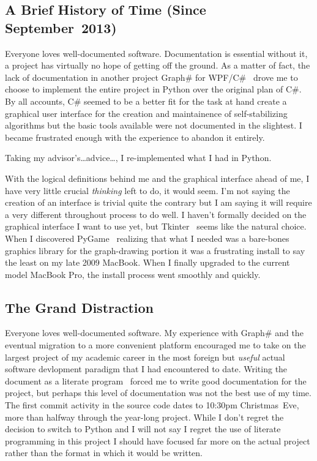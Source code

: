 \subsection{A Brief History of Time (Since September~2013)}
Everyone loves well-documented software.
Documentation is essential \Dash without it, a project has virtually no hope of getting off the ground.
As a matter of fact, the lack of documentation in another project \Dash
  Graph\# for WPF/C\#~\autocite{palesz:graphsharp} \Dash
  drove me to choose to implement the entire project in Python over the original plan of C\#.
By all accounts, C\# seemed to be a better fit for the task at hand \Dash
  create a graphical user interface for the creation and maintainence of self-stabilizing algorithms \Dash
  but the basic tools available were not documented in the slightest.
I became frustrated enough with the experience to abandon it entirely.

Taking my advisor's\dots advice\dots, I re-implemented what I had in Python.

\bigskip

With the logical definitions behind me and the graphical interface ahead of me,
  I have very little crucial \emph{thinking} left to do, it would seem.
I'm not saying the creation of an interface is trivial \Dash quite the contrary \Dash
  but I am saying it will require a very different throughout process to do well.
I haven't formally decided on the graphical interface I want to use yet,
  but Tkinter~\autocite{tkinter} seems like the natural choice.
When I discovered PyGame~\autocite{pygame} \Dash realizing that what I needed was
  a bare-bones graphics library for the graph-drawing portion \Dash
  it was a frustrating install to say the least on my late 2009 MacBook.
When I finally upgraded to the current model MacBook Pro,
  the install process went smoothly and quickly.

\subsection{The Grand Distraction}
Everyone loves well-documented software.
My experience with Graph\# \Dash and the eventual migration to a more convenient platform \Dash
  encouraged me to take on the largest project of my academic career in
  the most foreign \Dash but \emph{useful} \Dash actual software devlopment paradigm
  that I had encountered to date.
Writing the document as a literate program~\autocite{knuth:lit-prog}
  forced me to write good documentation for the project,
  but perhaps this level of documentation was not the best use of my time.
The first commit activity in the source code dates to 10:30pm Christmas~Eve,
  more than halfway through the year-long project.
While I don't regret the decision to switch to Python \Dash
  and I will not say I regret the use of literate programming in this project \Dash
  I should have focused far more on the actual project
  rather than the format in which it would be written.

